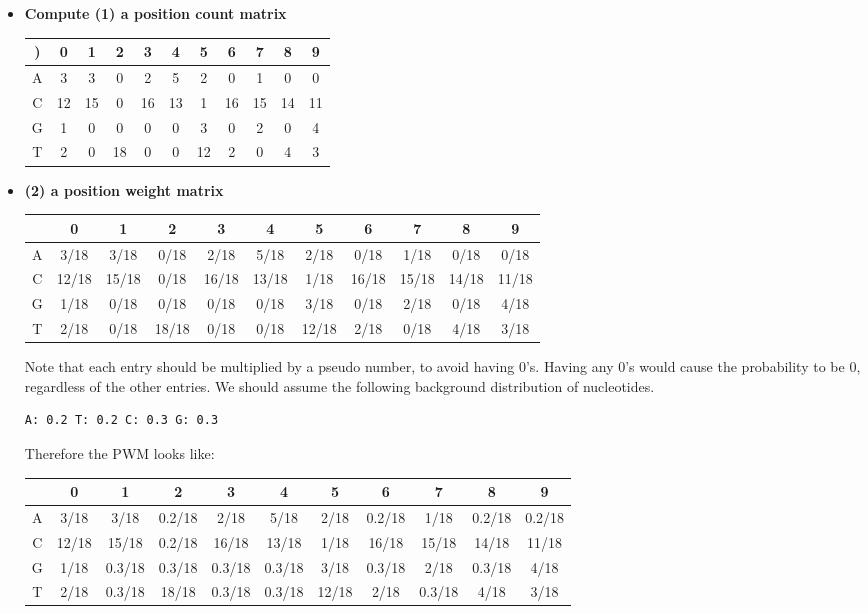 \documentclass[a4paper,10pt,titlepage]{article}
\begin{document}
\begin{itemize}
\item
\textbf{Compute (1) a position count matrix} 
\begin{table}[!h]
\begin{tabular}{c | c | c | c | c | c | c | c | c | c | c | })
  & 0  & 1  & 2  & 3  & 4  & 5  & 6  & 7  & 8  & 9 \\
  \hline
	A & 3  & 3  & 0  & 2  & 5  & 2  & 0  & 1  & 0  & 0 \\
	C & 12 & 15 & 0  & 16 & 13 & 1  & 16 & 15 & 14 & 11 \\
	G & 1  & 0  & 0  & 0  & 0  & 3  & 0  & 2  & 0  & 4 \\
	T & 2  & 0  & 18 & 0  & 0  & 12 & 2  & 0  & 4  & 3 \\
\end{tabular}
\end{table}
\item
\textbf{(2) a position weight matrix} 
\begin{table}[!h]
  \begin{tabular}{| c | c | c | c | c | c | c | c | c | c | c}
	  & 0 	  & 1     & 2     & 3  	  & 4  & 5  & 6  & 7  & 8  & 9 \\
	\hline
	A & 3/18  & 3/18  & 0/18  & 2/18  & 5/18  & 2/18  & 0/18  & 1/18  & 0/18  & 0/18 \\
	C & 12/18 & 15/18 & 0/18  & 16/18 & 13/18 & 1/18  & 16/18 & 15/18 & 14/18 & 11/18\\
	G & 1/18  & 0/18  & 0/18  & 0/18  & 0/18  & 3/18  & 0/18  & 2/18  & 0/18  & 4/18 \\
	T & 2/18  & 0/18  & 18/18 & 0/18  & 0/18  & 12/18 & 2/18  & 0/18  & 4/18  & 3/18 \\
  \end{tabular}
\end{table}
Note that each entry should be multiplied by a pseudo number, to avoid having 0's. Having any 0's would cause the probability to be 0, regardless of the other entries.
We should assume the following background distribution of nucleotides.
\begin{verbatim}
A: 0.2 T: 0.2 C: 0.3 G: 0.3
\end{verbatim}
Therefore the PWM looks like:
\begin{table}[!h]
  \begin{tabular}{| c | c | c | c | c | c | c | c | c | c | c}
	  & 0  & 1  & 2  & 3  & 4  & 5  & 6  & 7  & 8  & 9 \\
	\hline
	A & 3/18  & 3/18  & 0.2/18  & 2/18  & 5/18  & 2/18  & 0.2/18  & 1/18  & 0.2/18  & 0.2/18 \\
	C & 12/18 & 15/18 & 0.2/18  & 16/18 & 13/18 & 1/18  & 16/18 & 15/18 & 14/18 & 11/18\\
	G & 1/18  & 0.3/18  & 0.3/18  & 0.3/18  & 0.3/18  & 3/18  & 0.3/18  & 2/18  & 0.3/18  & 4/18 \\
	T & 2/18  & 0.3/18  & 18/18 & 0.3/18  & 0.3/18  & 12/18 & 2/18  & 0.3/18  & 4/18  & 3/18 \\
	\end{tabular}
\end{table}

\end{itemize}
\end{document}
